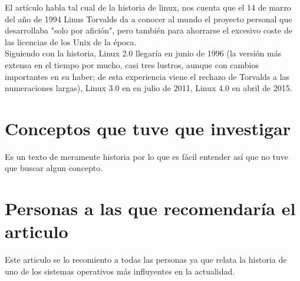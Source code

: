 \documentclass[11pt, a4paper]{report}
\begin{document}
El artículo habla tal cual de la historia de linux, nos cuenta que el 14 de
marzo del año de 1994 Linus Torvalds da a conocer al mundo el proyecto personal
que desarrollaba "solo por afición", pero también para ahorrarse el excesivo
coste de las licencias de los Unix de la época. \\

Siguiendo con la historia, Linux 2.0 llegaría en junio de 1996 (la versión más
extensa en el tiempo por mucho, casi tres lustros, aunque con cambios
importantes en su haber; de esta experiencia viene el rechazo de Torvalds a las
numeraciones largas), Linux 3.0 en en julio de 2011, Linux 4.0 en abril de 2015.
\\

\section*{Conceptos que tuve que investigar}
Es un texto de meramente historia por lo que es fácil entender así que no tuve
que buscar algun concepto. 

\section*{Personas a las que recomendaría el articulo}
Este articulo se lo recomiento a todas las personas ya que relata la historia
de uno de los sistemas operativos más influyentes en la actualidad. 
\end{document}

